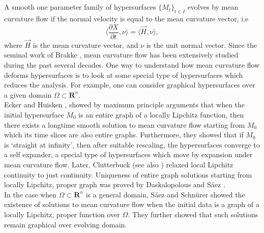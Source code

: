 \documentclass[pdflatex,sn-mathphys-num]{sn-jnl}%
\begin{document}
\section{}
A smooth one parameter family of hypersurfaces $\{M_t\}_{t \in I}$ evolves by mean curvature flow if the normal velocity is equal to the mean curvature vector, i.e
\begin{equation}
    \langle \frac{\partial X}{\partial t}, \nu \rangle = \langle \Vec{H}, \nu \rangle,
\end{equation}
where $\Vec{H}$ is the mean curvature vector, and $\nu$ is the unit normal vector. Since the seminal work of Brakke \cite{brakke}, mean curvature flow has been extensively studied during the past several decades. One way to understand how mean curvature flow deforms hypersurfaces is to look at some special type of hypersurfaces which reduces the analysis. For example, one can consider graphical hypersurfaces over a given domain $\Omega \subset \mathbf{R}^n$. \\

Ecker and Huisken \cite{eckerhuisken}, \cite{Ecker1991InteriorEF} showed by maximum principle arguments that when the initial hypersurface $M_0$ is an entire graph of a locally Lipchitz function, then there exists a longtime smooth solution to mean curvature flow starting from $M_0$ which its time slices are also entire graphs. Furthermore, they showed that if $M_0$ is `straight at infinity', then after suitable rescaling, the hypersurfaces converge to a self expander, a special type of hypersurfaces which move by expansion under mean curvature flow. Later, Clutterbuck \cite{Clutterbuck2005ParabolicEW} (see also \cite{bowlstability}) relaxed local Lipchitz continuity to just continuity. Uniqueness of entire graph solutions starting from locally Lipchitz, proper graph was proved by Daskalopolous and S\'aez \cite{Daskalopoulos2021UniquenessOE}. \\

In the case when $\Omega \subset \mathbf{R}^n$ is a general domain, S\'aez and Schn\" urer \cite{graphicalmcfoverdomain} showed the existence of solutions to mean curvature flow when the initial data is a graph of a locally Lipchitz, proper function over $\Omega$. They further showed that such solutions remain graphical over evolving domain. \\
\end{document}
